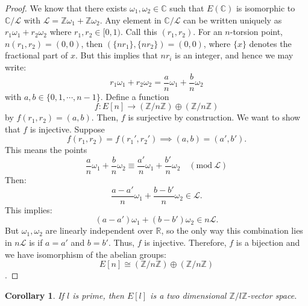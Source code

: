\documentclass{article}
\newtheorem{cor}{Corollary}[section]
\theoremstyle{definition}
\theoremstyle{definition}
\theoremstyle{definition}
\newcommand{\C}{\mathbb{C}}
\newcommand{\Z}{\mathbb{Z}}
\begin{document}
\begin{proof}
  We know that there exists $\omega_1,\omega_2\in\C$ such that $E(\C)$ is isomorphic to $\C/\mathcal{L}$ with $\mathcal{L}=\Z\omega_1+\Z\omega_2$. Any element in $\C/\mathcal{L}$ can be written uniquely as $r_1\omega_1+r_2\omega_2$ where $r_1,r_2\in[0,1)$.  Call this $(r_1,r_2)$. For an $n$-torsion point,  $n(r_1,r_2)=(0,0)$, then $(\{nr_1\},\{nr_2\})=(0,0)$, where $\{x\}$ denotes the fractional part of $x$. But this implies that $nr_i$ is an integer, and hence we may  write: $$r_1\omega_1+r_2\omega_2=\frac{a}{n}\omega_1+\frac{b}{n}\omega_2$$ with $a,b\in \{0,1, \cdots, n-1\}$. Define a function
  $$f:E[n]\to (\mathbb{Z}/n\mathbb{Z}) \oplus (\mathbb{Z}/n\mathbb{Z})$$ by $f(r_1, r_2)=(a,b)$. Then, $f$ is surjective by construction. We want to show that $f$ is injective. Suppose $$f(r_1,r_2)=f(r_1', r_2') \implies(a,b)=(a',b').$$ This means the points $$\frac{a}{n}\omega_1+\frac{b}{n}\omega_2 \equiv \frac{a'}{n}\omega_1+\frac{b'}{n}\omega_2 \quad (\text{mod}\ \mathcal{L})$$
  Then: $$\frac{a-a'}{n}\omega_1+\frac{b-b'}{n}\omega_2\in \mathcal{L}.$$ This implies: $$(a-a')\omega_1+(b-b')\omega_2\in n\mathcal{L}.$$ But $\omega_1, \omega_2$ are linearly independent over $\mathbb{R}$, so the only way this combination lies in $n\mathcal{L}$ is if $a=a'$ and $b=b'$. Thus, $f$ is injective. \newline \newline Therefore, $f$ is a bijection and we have isomorphism of the abelian groups: $$ E[n] \cong (\mathbb{Z}/n\mathbb{Z}) \oplus (\mathbb{Z}/n\mathbb{Z})$$. 
\end{proof}
\begin{cor}
   If $l$ is prime, then $E[l]$ is a two dimensional $\Z/l\Z$-vector space. 
\end{cor}
\end{document}
